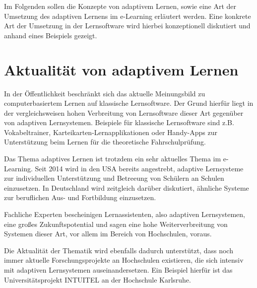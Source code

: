 Im Folgenden sollen die Konzepte von adaptivem Lernen, sowie eine Art der
Umsetzung des adaptiven Lernens im e-Learning erläutert werden.
Eine konkrete Art der Umsetzung in der Lernsoftware wird hierbei konzeptionell
diskutiert und anhand eines Beispiels gezeigt.

\section{Aktualität von adaptivem Lernen}
In der Öffentlichkeit beschränkt sich das aktuelle Meinungsbild zu computerbasiertem Lernen
auf klassische Lernsoftware. Der Grund hierfür liegt in der vergleichsweisen hohen Verbreitung
von Lernsoftware dieser Art gegenüber von adaptiven Lernsystemen. Beispiele für klassische Lernsoftware
sind z.B. Vokabeltrainer, Karteikarten-Lernapplikationen oder Handy-Apps zur Unterstützung beim Lernen für die theoretische
Fahrschulprüfung.

Das Thema adaptives Lernen ist trotzdem ein sehr aktuelles Thema im e-Learning.
Seit 2014 wird in den USA bereits angestrebt, adaptive Lernsysteme zur
individuellen Unterstützung und Betreeung von Schülern an Schulen einzusetzen.
In Deutschland wird zeitgleich darüber diskutiert, ähnliche Systeme zur beruflichen Aus- und Fortbildung
einzusetzen.
\cite[S. 2, S. 8]{mmb2014}

Fachliche Experten bescheinigen Lernassistenten, also adaptiven Lernsystemen, eine großes Zukunftspotential
und sagen eine hohe Weiterverbreitung von Systemen dieser Art, vor allem im Bereich von Hochschulen, voraus.
\cite[S. 2]{mmb2014}

Die Aktualität der Thematik wird ebenfalls dadurch unterstützt, dass noch immer aktuelle
Forschungsprojekte an Hochschulen existieren, die sich intensiv mit adaptiven Lernsystemen auseinandersetzen.
Ein Beispiel hierfür ist das Universitätsprojekt INTUITEL an der Hochschule Karlsruhe.
\cite[S. 2]{mmb2014}
